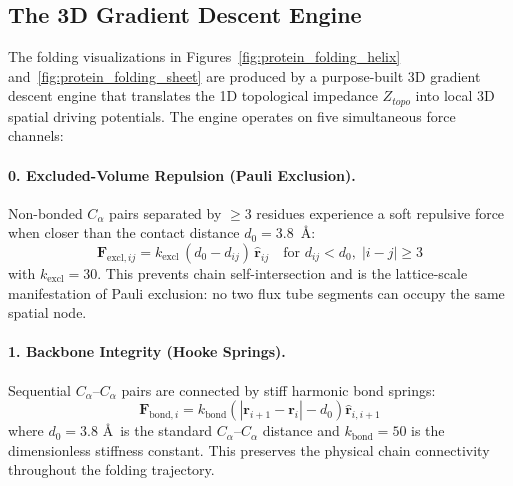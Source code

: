 \subsection{The 3D Gradient Descent Engine}

The folding visualizations in Figures~\ref{fig:protein_folding_helix} and~\ref{fig:protein_folding_sheet} are produced by a purpose-built 3D gradient descent engine that translates the 1D topological impedance $Z_{topo}$ into local 3D spatial driving potentials. The engine operates on five simultaneous force channels:

\paragraph{0. Excluded-Volume Repulsion (Pauli Exclusion).}
Non-bonded $C_\alpha$ pairs separated by $\geq 3$ residues experience a soft repulsive force when closer than the contact distance $d_0 = 3.8$~\AA:
\begin{equation}
    \mathbf{F}_{\text{excl},ij} = k_{\text{excl}} \, (d_0 - d_{ij}) \, \hat{\mathbf{r}}_{ij} \quad \text{for } d_{ij} < d_0,\; |i-j| \geq 3
    \label{eq:excluded_volume}
\end{equation}
with $k_{\text{excl}} = 30$. This prevents chain self-intersection and is the lattice-scale manifestation of Pauli exclusion: no two flux tube segments can occupy the same spatial node.

\paragraph{1. Backbone Integrity (Hooke Springs).}
Sequential $C_\alpha$--$C_\alpha$ pairs are connected by stiff harmonic bond springs:
\begin{equation}
    \mathbf{F}_{\text{bond},i} = k_{\text{bond}} \left( |\mathbf{r}_{i+1} - \mathbf{r}_i| - d_0 \right) \hat{\mathbf{r}}_{i,i+1}
    \label{eq:backbone_hooke}
\end{equation}
where $d_0 = 3.8$ \AA\ is the standard $C_\alpha$--$C_\alpha$ distance and $k_{\text{bond}} = 50$ is the dimensionless stiffness constant. This preserves the physical chain connectivity throughout the folding trajectory.

